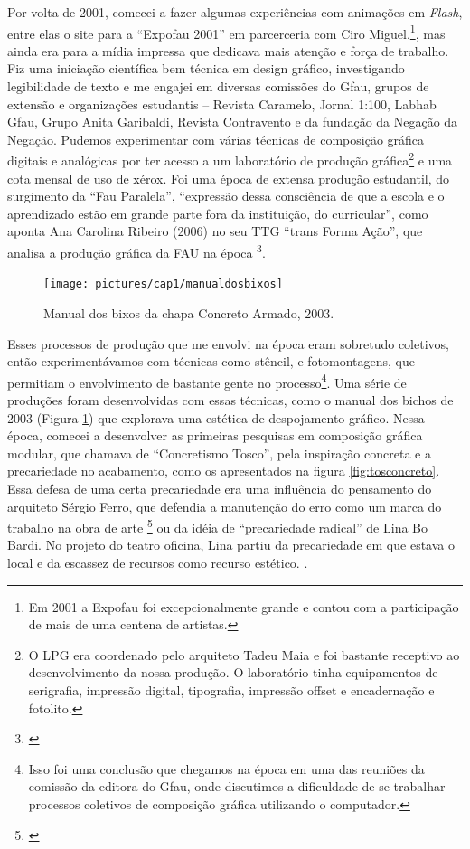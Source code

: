  Por volta de 2001, comecei a fazer algumas experiências com animações em \emph{Flash}, entre elas o site para a ``Expofau 2001'' em parcerceria com Ciro Miguel.\footnote{Em 2001 a Expofau foi excepcionalmente grande e contou com a participação de mais de uma centena de artistas.}, mas ainda era para a mídia impressa que dedicava mais atenção e força de trabalho. Fiz uma iniciação científica bem técnica em design gráfico, investigando legibilidade de texto  e me engajei em diversas comissões do Gfau, grupos de extensão e organizações estudantis – Revista Caramelo, Jornal 1:100, Labhab Gfau, Grupo Anita Garibaldi, Revista Contravento e da fundação da Negação da Negação. Pudemos experimentar com várias técnicas de composição gráfica digitais e analógicas por ter acesso a um laboratório de produção gráfica\footnote{O LPG era coordenado pelo arquiteto Tadeu Maia e foi bastante receptivo ao desenvolvimento da nossa produção. O laboratório tinha equipamentos de serigrafia, impressão digital, tipografia, impressão offset e encadernação e fotolito.} e uma cota mensal de uso de xérox. Foi uma época de extensa produção estudantil, do surgimento da ``Fau Paralela'', ``expressão dessa consciência de que a escola e o aprendizado estão em grande parte fora da instituição, do curricular'', como aponta Ana Carolina Ribeiro (2006) no seu TTG ``trans Forma Ação'', que analisa a produção gráfica da FAU na época \footnote{\cite{Ribeiro2006}}. 

\begin{figure}

\texttt{[image: pictures/cap1/manualdosbixos]}
\caption{Manual dos bixos da chapa Concreto Armado, 2003.}
\label{fig:bichos}
\end{figure}

Esses processos de produção que me envolvi na época eram sobretudo coletivos, então experimentávamos com técnicas como stêncil, e fotomontagens, que permitiam o envolvimento de bastante gente no processo\footnote{Isso foi uma conclusão que chegamos na época em uma das reuniões da comissão da editora do Gfau, onde discutimos a dificuldade de se trabalhar processos coletivos de composição gráfica utilizando o computador.}. Uma série de produções foram desenvolvidas com essas técnicas, como o manual dos bichos de 2003 (Figura \ref{fig:bichos}) que explorava uma estética de despojamento gráfico. Nessa época, comecei a desenvolver as primeiras pesquisas em composição gráfica modular, que chamava de ``Concretismo Tosco'', pela inspiração concreta e a precariedade no acabamento, como os apresentados na figura \ref{fig:tosconcreto}. Essa defesa de uma certa precariedade era uma influência do pensamento do arquiteto Sérgio Ferro, que defendia a manutenção do erro como um marca do trabalho na obra de arte \footnote{\cite{FerroSergio2002}} ou da idéia de ``precariedade radical'' de Lina Bo Bardi. No projeto do teatro oficina, Lina partiu da precariedade em que estava o local e da escassez de recursos como recurso estético.  \cite{Macedo2015}. 

